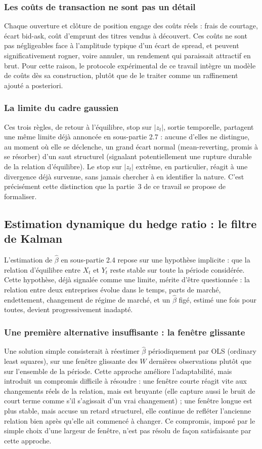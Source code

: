 \documentclass{article}
\newcommand{\rev}[1]{{\color{red}#1}}
\begin{document}
\subsubsection*{Les coûts de transaction ne sont pas un détail}
Chaque ouverture et clôture de position engage des coûts réels : frais de courtage, écart bid-ask, coût d'emprunt des titres vendus à découvert. Ces coûts ne sont pas négligeables face à l'amplitude typique d'un écart de spread, et peuvent significativement rogner, voire annuler, un rendement qui paraissait attractif en brut. Pour cette raison, le protocole expérimental de ce travail intègre un modèle de coûts dès sa construction, plutôt que de le traiter comme un raffinement ajouté a posteriori.
\subsubsection*{La limite du cadre gaussien}
Ces trois règles, de retour à l'équilibre, stop sur $|z_t|$, sortie temporelle\rev{,} partagent une même limite déjà annoncée en sous-partie 2.7 : aucune d'elles ne distingue, au moment où elle se déclenche, un grand écart normal (mean-reverting, promis à se résorber) d'un saut structurel (signalant potentiellement une rupture durable de la relation d'équilibre). Le stop sur $|z_t|$ extrême, en particulier, réagit à une divergence déjà survenue, sans jamais chercher à en identifier la nature. C'est précisément cette distinction que la partie~3 de ce travail se propose de formaliser.
\subsection{Estimation dynamique du hedge ratio : le filtre de Kalman}
L'estimation de $\hat\beta$ en sous-partie 2.4 repose sur une hypothèse implicite : que la relation d'équilibre entre $X_t$ et $Y_t$ reste stable sur toute la période considérée. Cette hypothèse, déjà signalée comme une limite, mérite d'être questionnée : la relation entre deux entreprises évolue dans le temps, parts de marché, endettement, changement de régime de marché, et un $\hat\beta$ figé, estimé une fois pour toutes, devient progressivement inadapté. 
\subsubsection*{Une première alternative insuffisante : la fenêtre glissante}
Une solution simple consisterait à réestimer $\hat\beta$ périodiquement par OLS (ordinary least squares), sur une fenêtre glissante des $W$ dernières observations plutôt que sur l'ensemble de la période. Cette approche améliore l'adaptabilité, mais introduit un compromis difficile à résoudre : une fenêtre courte réagit vite aux changements réels de la relation, mais est bruyante (elle capture aussi le bruit de court terme comme s'il s'agissait d'un vrai changement) ; une fenêtre longue est plus stable, mais accuse un retard structurel, elle continue de refléter l'ancienne relation bien après qu'elle ait commencé à changer. Ce compromis, imposé par le simple choix d'une largeur de fenêtre, n'est pas résolu de façon satisfaisante par cette approche.
\end{document}
